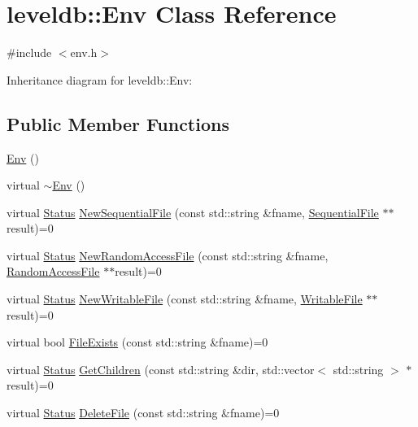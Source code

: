 \hypertarget{classleveldb_1_1_env}{}\section{leveldb\+:\+:Env Class Reference}
\label{classleveldb_1_1_env}


{\ttfamily \#include $<$env.\+h$>$}



Inheritance diagram for leveldb\+:\+:Env\+:
\subsection*{Public Member Functions}
\begin{DoxyCompactItemize}
\item 
\hyperlink{classleveldb_1_1_env_a90f3648c740e3f5901f5843cd0dd07c4}{Env} ()
\item 
virtual \hyperlink{classleveldb_1_1_env_a2b9321c6176f8824b3ba65f0a36453fe}{$\sim$\+Env} ()
\item 
virtual \hyperlink{classleveldb_1_1_status}{Status} \hyperlink{classleveldb_1_1_env_ad73810059f48c1d7b91125d357e7d351}{New\+Sequential\+File} (const std\+::string \&fname, \hyperlink{classleveldb_1_1_sequential_file}{Sequential\+File} $\ast$$\ast$result)=0
\item 
virtual \hyperlink{classleveldb_1_1_status}{Status} \hyperlink{classleveldb_1_1_env_a1df3e0bb2d47ee914448df9bb9ca0734}{New\+Random\+Access\+File} (const std\+::string \&fname, \hyperlink{classleveldb_1_1_random_access_file}{Random\+Access\+File} $\ast$$\ast$result)=0
\item 
virtual \hyperlink{classleveldb_1_1_status}{Status} \hyperlink{classleveldb_1_1_env_a4566194f3e82fede425fdb5bb355f7de}{New\+Writable\+File} (const std\+::string \&fname, \hyperlink{classleveldb_1_1_writable_file}{Writable\+File} $\ast$$\ast$result)=0
\item 
virtual bool \hyperlink{classleveldb_1_1_env_acbb85047fdf7bf441bd365cfb09f9ecb}{File\+Exists} (const std\+::string \&fname)=0
\item 
virtual \hyperlink{classleveldb_1_1_status}{Status} \hyperlink{classleveldb_1_1_env_a53028e3112d7bb3bf6574ddaab18d6f6}{Get\+Children} (const std\+::string \&dir, std\+::vector$<$ std\+::string $>$ $\ast$result)=0
\item 
virtual \hyperlink{classleveldb_1_1_status}{Status} \hyperlink{classleveldb_1_1_env_ac956b984466d5f09309664177687f9af}{Delete\+File} (const std\+::string \&fname)=0
$$
\end{DoxyCompactItemize}
